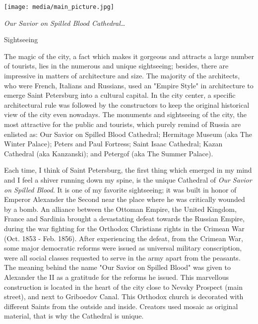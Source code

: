 \documentclass[10pt,a4paper]{article} %
\newcommand{\NewsItem}[1]{ %
\usefont{T1}{fvs}{n}{n} %
\vspace{24pt}\large #1\vspace{3pt} %
\par \normalsize \normalfont}
\begin{document}
\begin{center}
\vspace{10pt}
\texttt{[image: media/main\_picture.jpg]} %
\par\large\textit{Our Savior on Spilled Blood Cathedral\ldots}
\vspace{10pt}
\end{center}

\begin{multicols}{3} %

\NewsItem{Sightseeing}
The magic of the city, a fact which makes it gorgeous and attracts 
a large number of tourists, lies in the numerous and unique sightseeing; 
besides, there are impressive in matters of architecture and size. 
The majority of the architects, who were French, Italians and Russians, 
used an "Empire Style" in architecture to emerge Saint Petersburg 
into a cultural capital. 
In the city center, a specific architectural rule was followed 
by the constructors to keep the original historical view of the city even nowadays. 
The monuments and sightseeing of the city, the most attractive for the public and tourists, 
which purely remind of Russia are enlisted as: Our Savior on Spilled Blood Cathedral; 
Hermitage Museum (aka The Winter Palace); Peters and Paul Fortress; Saint Isaac Cathedral; 
Kazan Cathedral (aka Kanzanski); and Petergof (aka The Summer Palace).

Each time, I think of Saint Petersburg, the first thing which emerged in my mind and 
I feel a shiver running down my spine, is the unique Cathedral 
of \textit{Our Savior on Spilled Blood}. 
It is one of my favorite sightseeing; it was built in honor of Emperor Alexander 
the Second near the place where he was critically wounded by a bomb. 
An alliance between the Ottoman Empire, the United Kingdom, 
France and Sardinia brought a devastating defeat towards the Russian Empire, 
during the war fighting for the Orthodox Christians rights in the Crimean War 
(Oct. 1853 - Feb. 1856). 
After experiencing the defeat, from the Crimean War, 
some major democratic reforms were issued as universal military conscription, 
were all social classes requested to serve in the army apart from the peasants. 
The meaning behind the name "Our Savior on Spilled Blood" was given to 
Alexander the II as a gratitude for the reforms he issued. 
This marvellous construction is located in the heart of the city close 
to Nevsky Prospect (main street), and next to Griboedov Canal. 
This Orthodox church is decorated with different Saints from the outside and inside. 
Creators used mosaic as original material, that is why the Cathedral is unique.


\end{multicols}
\end{document}
